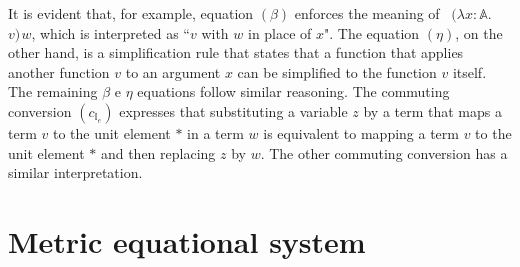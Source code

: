 It is evident that, for example, equation $(\beta)$ enforces the meaning of  $(\lambda x : \mathbb{A}.$ $v) \hspace{1pt} w $, which is interpreted as ``$v$ with $w$ in place of $x$". The equation $(\eta)$, on the other hand, is a simplification rule that states that a function that applies another function $v$ to an argument $x$ can be simplified to the function $v$ itself. The remaining $\beta$ e $\eta$ equations follow similar reasoning. The commuting conversion $(c_{\mathbb{I}_{e}})$ expresses that substituting a variable $z$ by a term that maps a term $v$ to the unit element $*$ in a term $w$ is equivalent to mapping a term $v$ to the unit element $*$ and then replacing $z$ by $w$. The other commuting conversion has a similar interpretation.




\section{Metric equational system}

